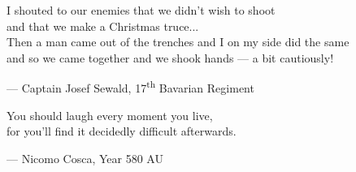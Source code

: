 \begin{flushright}
\begin{hangleftquote}{\QENOpen}{\QENClose}
I shouted to our enemies that we didn't wish to shoot\\
and that we make a Christmas truce...\\
Then a man came out of the trenches and I on my side did the same\\
and so we came together and we shook hands — a bit cautiously!
\end{hangleftquote}
\par\smallskip
\normalfont — Captain Josef Sewald, 17\textsuperscript{th} Bavarian Regiment
\end{flushright}
\vspace{2em}
\begin{flushright}
\begin{hangleftquote}{\QENOpen}{\QENClose}
You should laugh every moment you live,\\
for you'll find it decidedly difficult afterwards.
\end{hangleftquote}
\par\smallskip
\normalfont — Nicomo Cosca, Year 580 AU
\end{flushright}
